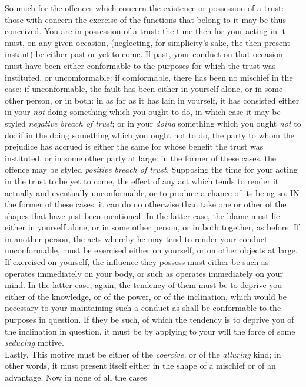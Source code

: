 \documentclass[12pt]{report}
\begin{document}
So much for the offences which concern the existence or possession of a
trust: those with concern the exercise of the functions that belong to
it may be thus conceived. You are in possession of a trust: the time
then for your acting in it must, on any given occasion, (neglecting, for
simplicity's sake, the then present instant) be either past or yet to
come. If past, your conduct on that occasion must have been either
conformable to the purposes for which the trust was instituted, or
uncomformable: if comformable, there has been no mischief in the case:
if unconformable, the fault has been either in yourself alone, or in
some other person, or in both: in as far as it has lain in yourself, it
has consisted either in your \emph{not} doing something which you ought
to do, in which case it may be styled \emph{negative breach of trust};
or in your \emph{doing} something which you ought \emph{not} to do: if
in the doing something which you ought not to do, the party to whom the
prejudice has accrued is either the same for whose benefit the trust was
instituted, or in some other party at large: in the former of these
cases, the offence may be styled \emph{positive breach of trust.}
Supposing the time for your acting in the trust to be yet to come, the
effect of any act which tends to render it actually and eventually
unconformable, or to produce a chance of its being so. IN the former of
these cases, it can do no otherwise than take one or other of the shapes
that have just been mentioned. In the latter case, the blame must lie
either in yourself alone, or in some other person, or in both together,
as before. If in another person, the acts whereby he may tend to render
your conduct unconformable, must be exercised either on yourself, or on
other objects at large. If exercised on yourself, the influence they
possess must either be such as operates immediately on your body, or
such as operates immediately on your mind. In the latter case, again,
the tendency of them must be to deprive you either of the knowledge, or
of the power, or of the inclination, which would be necessary to your
maintaining such a conduct as shall be conformable to the purposes in
question. If they be such, of which the tendency is to deprive you of
the inclination in question, it must be by applying to your will the
force of some \emph{seducing} motive.\\
Lastly, This motive must be either of the \emph{coercive,} or of the
\emph{alluring} kind; in other words, it must present itself either in
the shape of a mischief or of an advantage. Now in none of all the cases
\end{document}
